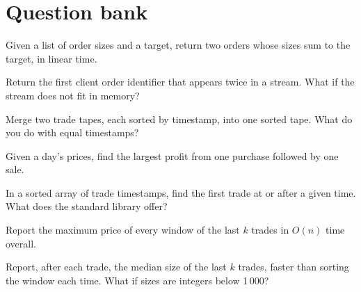 \section{Question bank}

\begin{interviewq}\label{iq:iv:algorithms-and-data-structures:1}
Given a list of order sizes and a target, return two orders whose sizes sum to the target, in linear time.
\end{interviewq}

\begin{interviewq}\label{iq:iv:algorithms-and-data-structures:2}
Return the first client order identifier that appears twice in a stream. What if the stream does not fit in memory?
\end{interviewq}

\begin{interviewq}\label{iq:iv:algorithms-and-data-structures:3}
Merge two trade tapes, each sorted by timestamp, into one sorted tape. What do you do with equal timestamps?
\end{interviewq}

\begin{interviewq}\label{iq:iv:algorithms-and-data-structures:4}
Given a day's prices, find the largest profit from one purchase followed by one sale.
\end{interviewq}

\begin{interviewq}\label{iq:iv:algorithms-and-data-structures:5}
In a sorted array of trade timestamps, find the first trade at or after a given time. What does the standard library offer?
\end{interviewq}

\begin{interviewq}\label{iq:iv:algorithms-and-data-structures:6}
Report the maximum price of every window of the last $k$ trades in $O(n)$ time overall.
\end{interviewq}

\begin{interviewq}\label{iq:iv:algorithms-and-data-structures:7}
Report, after each trade, the median size of the last $k$ trades, faster than sorting the window each time. What if sizes are
integers below 1\,000?
\end{interviewq}

